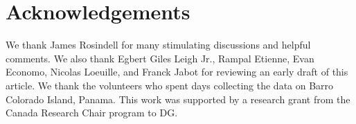 \documentclass[letterpaper,twocolumn,superscriptaddress,showkeys]{revtex4}
\begin{document}
\section{Acknowledgements}

We thank James Rosindell for many stimulating discussions and helpful comments. We also thank Egbert Giles Leigh Jr., Rampal Etienne, Evan Economo, Nicolas Loeuille, and Franck Jabot for reviewing an early draft of this article. We thank the volunteers who spent days collecting the data on Barro Colorado Island, Panama. This work was supported by a research grant from the Canada Research Chair program to DG.



\end{document}
